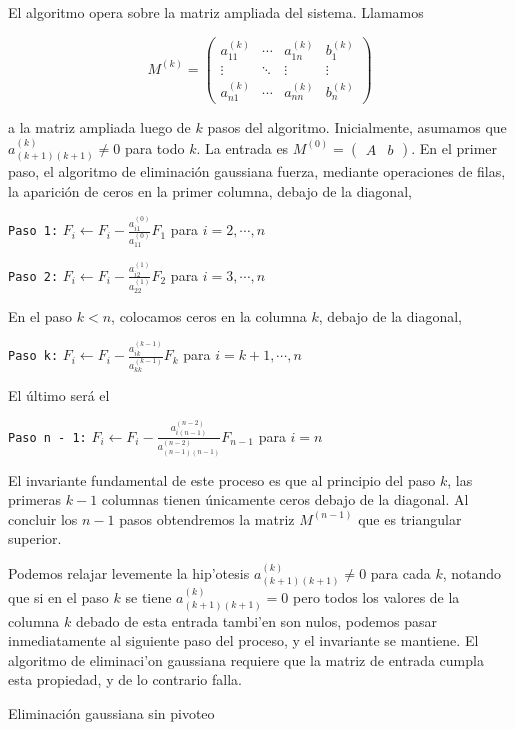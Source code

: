 El algoritmo opera sobre la matriz ampliada del sistema. Llamamos

\[M^{(k)} = \left(\begin{array}{ccc|c}
a_{11}^{(k)} & \cdots & a_{1n}^{(k)} & b_1^{(k)}\\
\vdots & \ddots & \vdots & \vdots\\
a_{n1}^{(k)} & \cdots & a_{nn}^{(k)} & b_n^{(k)}
\end{array}\right)\]

a la matriz ampliada luego de $k$ pasos del algoritmo. Inicialmente, asumamos que $a_{(k+1)(k+1)}^{(k)} \neq 0$ para todo $k$. La entrada es $M^{(0)} = \left(\begin{array}{c|c}A & b\end{array}\right)$. En el primer paso, el algoritmo de eliminación gaussiana fuerza, mediante operaciones de filas, la aparición de ceros en la primer columna, debajo de la diagonal,

\texttt{Paso 1:} $F_i \leftarrow F_i - \frac{a_{i1}^{(0)}}{a_{11}^{(0)}}F_1$ para $i = 2, \cdots, n$

\texttt{Paso 2:} $F_i \leftarrow F_i - \frac{a_{i2}^{(1)}}{a_{22}^{(1)}}F_2$ para $i = 3, \cdots, n$

En el paso $k < n$, colocamos ceros en la columna $k$, debajo de la diagonal,

\texttt{Paso k:} $F_i \leftarrow F_i - \frac{a_{ik}^{(k - 1)}}{a_{kk}^{(k - 1)}}F_k$ para $i = k + 1, \cdots, n$

El último será el

\texttt{Paso n - 1:} $F_i \leftarrow F_i - \frac{a_{i(n-1)}^{(n-2)}}{a_{(n-1)(n-1)}^{(n-2)}}F_{n - 1}$ para $i = n$

El invariante fundamental de este proceso es que al principio del paso $k$, las primeras $k - 1$ columnas tienen únicamente ceros debajo de la diagonal. Al concluir los $n - 1$ pasos obtendremos la matriz $M^{(n - 1)}$ que es triangular superior.

Podemos relajar levemente la hip'otesis $a_{(k+1)(k+1)}^{(k)} \neq 0$ para cada $k$, notando que si en el paso $k$ se tiene $a_{(k+1)(k+1)}^{(k)} = 0$ pero todos los valores de la columna $k$ debado de esta entrada tambi'en son nulos, podemos pasar inmediatamente al siguiente paso del proceso, y el invariante se mantiene. El algoritmo de eliminaci'on gaussiana requiere que la matriz de entrada cumpla esta propiedad, y de lo contrario falla.
 
\begin{algorithm}
\DontPrintSemicolon
{}

\caption[]{Eliminación gaussiana sin pivoteo}
\end{algorithm}


